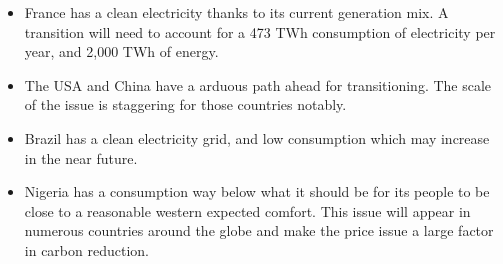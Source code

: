 \begin{kaoboxgreen}[frametitle=Main Takeaways]

\begin{itemize}
\item France has a clean electricity thanks to its current generation mix. A transition will need to account for a 473 TWh consumption of electricity per year, and 2,000 TWh of energy.
\item The USA and China have a arduous path ahead for transitioning. The scale of the issue is staggering for those countries notably.
\item Brazil has a clean electricity grid, and low consumption which may increase in the near future.
\item Nigeria has a consumption way below what it should be for its people to be close to a reasonable western expected comfort. This issue will appear in numerous countries around the globe and make the price issue a large factor in carbon reduction.
\end{itemize}
  
\end{kaoboxgreen}